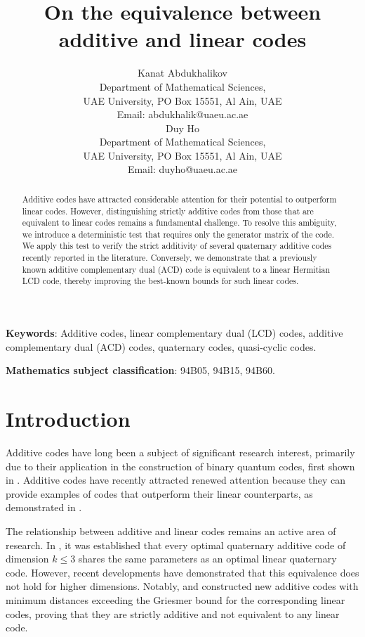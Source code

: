 \documentclass[a4paper,12pt]{article}
\title{On the equivalence between additive and linear codes}
\author{Kanat Abdukhalikov \\	
Department of Mathematical Sciences, \\
UAE University, PO Box 15551, Al Ain, UAE\\
Email: abdukhalik@uaeu.ac.ae \bigskip  \\  
Duy Ho \\
Department of Mathematical Sciences, \\
UAE University, PO Box 15551, Al Ain, UAE\\
Email: duyho@uaeu.ac.ae
}
\date{ }
\theoremstyle{plain}
\theoremstyle{definition}
\begin{document}
 

\maketitle





\begin{abstract} 
Additive codes have attracted considerable attention for their potential to outperform linear codes. 
However, distinguishing strictly additive codes from those that are equivalent to linear codes remains a fundamental challenge. 
To resolve this ambiguity, we introduce a deterministic test that requires only the generator matrix of the code.
We apply this test to verify the strict additivity of several quaternary additive codes recently reported in the literature. 
Conversely, we demonstrate that a previously known additive complementary dual (ACD) code is equivalent to a linear Hermitian LCD code, thereby improving the best-known bounds for such linear codes.

\end{abstract}

\textbf{Keywords}: Additive codes, linear complementary dual (LCD) codes, additive complementary dual (ACD) codes, quaternary codes, quasi-cyclic codes.

\textbf{Mathematics subject classification}: 94B05, 94B15, 94B60.



\section{Introduction}

Additive codes have long been a subject of significant research interest, primarily due to their  application in the construction of binary quantum codes, first shown in \cite{calderbank1998}. Additive codes have recently attracted renewed attention because they can provide examples of codes that outperform their linear counterparts, as demonstrated in  \cite{bierbrauer2021, guan2023, kurz2024}.

The relationship between additive and linear codes remains an active area of research. In \cite{bierbrauer2021}, it was established that every optimal quaternary additive code of dimension $k \leq 3$ shares the same parameters as an optimal linear quaternary code. However, recent developments have demonstrated that this equivalence does not hold for higher dimensions. Notably, \cite{ball2026} and \cite{kurz2024} constructed new additive codes with minimum distances exceeding the Griesmer bound for the corresponding linear codes,   proving that they are strictly additive and not equivalent to any linear code.
\end{document}
